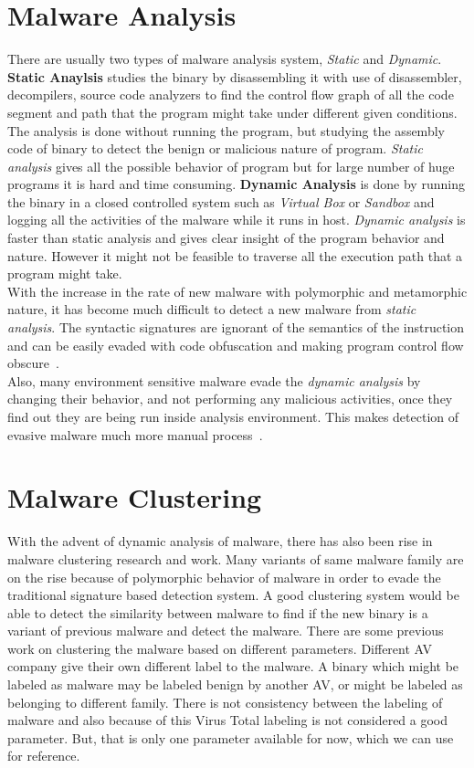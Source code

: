 \section{Malware Analysis}
\label{sec:Malware Analysis}
There are usually two types of malware analysis system, \emph{Static} and \emph{Dynamic}.\\
\textbf{Static Anaylsis} studies the binary by disassembling it with use of disassembler, decompilers, source code analyzers to find the control flow graph of all the code segment and path that the program might take under different given conditions.
The analysis is done without running the program, but studying the assembly code of binary to detect the benign or malicious nature of program.
\emph{Static analysis} gives all the possible behavior of program but for large number of huge programs it is hard and time consuming.
\textbf{Dynamic Analysis} is done by running the binary in a closed controlled system such as \emph{Virtual Box} or \emph{Sandbox} and logging all the activities of the malware while it runs in host.
\emph{Dynamic analysis} is faster than static analysis and gives clear insight of the program behavior and nature.
However it might not be feasible to traverse all the execution path that a program might take.
\\
With the increase in the rate of new malware with polymorphic and metamorphic nature, it has become much difficult to detect a new malware from \emph{static analysis}.
The syntactic signatures are ignorant of the semantics of the instruction and can be easily evaded with code obfuscation and making program control flow obscure~\cite[]{staticlimit}.\\
Also, many environment sensitive malware evade the \emph{dynamic analysis} by changing their behavior, and not performing any malicious activities, once they find out they are being run inside analysis environment.
This makes detection of evasive malware much more manual process~\cite[]{barecloud}.

\section{Malware Clustering}
\label{sec:Malware Clustering}
With the advent of dynamic analysis of malware, there has also been rise in malware clustering research and work.
Many variants of same malware family are on the rise because of polymorphic behavior of malware in order to evade the traditional signature based detection system.
A good clustering system would be able to detect the similarity between malware to find if the new binary is a variant of previous malware and detect the malware.
There are some previous work on clustering the malware based on different parameters.
Different AV company give their own different label to the malware.
A binary which might be labeled as malware may be labeled benign by another AV, or might be labeled as belonging to different family.
There is not consistency between the labeling of malware and also because of this Virus Total labeling is not considered a good parameter.
But, that is only one parameter available for now, which we can use for reference.
